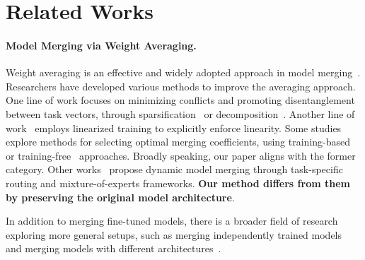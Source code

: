 \section{Related Works}
\paragraph{Model Merging via Weight Averaging.}
Weight averaging is an effective and widely adopted approach in model merging~\citep{izmailov2018averaging,wortsman2022model,ilharco2022editing}. Researchers have developed various methods to improve the averaging approach. One line of work focuses on minimizing conflicts and promoting disentanglement between task vectors, through sparsification~\citep{tang2023concrete,yadav2024ties, yu2024language,he2024localize,wang2024localizing,bowen2024beyond,deng2024dare,zhu2024model,davari2025model} or decomposition~\citep{tam2023merging,xiong2024multi, stoica2024model,wei2025modeling,gargiulo2024task,marczak2025no,yang2025mix}. Another line of work~\citep{ortiz2024task,tang2023parameter} employs linearized training to explicitly enforce linearity. Some studies explore methods for selecting optimal merging coefficients, using training-based~\citep{yang2023adamerging, gauthier2024merging,  nishimoto2024differentiable} or training-free~\citep{matena2022merging, jin2022dataless, zhou2024metagpt,wang2024lines,liu2024checkpoint,tang2025merging} approaches. Broadly speaking, our paper aligns with the former category. Other works~\citep{qi2024less, lu2024twin, zheng2024free,ohadapting,zhang2024channel,osial2024parameter,huang2024emr} propose dynamic model merging through task-specific routing and mixture-of-experts frameworks. \textbf{Our method differs from them by preserving the original model architecture}. 

In addition to merging fine-tuned models, there is a broader field of research exploring more general setups, such as merging independently trained models~\citep{singh2020model,ainsworth2022git,navon2023equivariant,horoi2024harmony,stoica2023zipit,xu2024training} and merging models with different architectures~\citep{avrahami2022gan,wan2024knowledge,wan2024fusechat}.


\vspace{-10pt}
